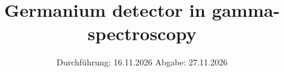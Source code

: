 

\subject{V18}
\title{Germanium detector in gamma-spectroscopy}
\date{%
  Durchführung: 16.11.2026
  \hspace{3em}
  Abgabe: 27.11.2026
}


\maketitle
\thispagestyle{empty}
\tableofcontents
\newpage








\printbibliography{}

